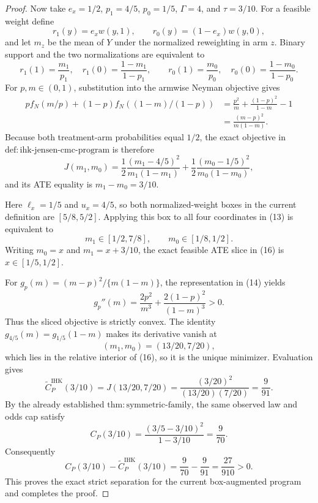 \documentclass{article}
\begin{document}
\begin{proof}
Now take \(e_x=1/2\), \(p_1=4/5\), \(p_0=1/5\), \(\Gamma=4\), and \(\tau=3/10\).  For a feasible weight define
\[
r_1(y)=e_xw(y,1),\qquad r_0(y)=(1-e_x)w(y,0),
\]
and let \(m_z\) be the mean of \(Y\) under the normalized reweighting in arm \(z\).  Binary support and the two normalizations are equivalent to
\[
r_1(1)=\frac{m_1}{p_1},\quad
r_1(0)=\frac{1-m_1}{1-p_1},\qquad
r_0(1)=\frac{m_0}{p_0},\quad
r_0(0)=\frac{1-m_0}{1-p_0}.
\tag{13}
\]
For \(p,m\in(0,1)\), substitution into the armwise Neyman objective gives
\[
\begin{aligned}
pf_N(m/p)+(1-p)f_N((1-m)/(1-p))
&=\frac{p^2}{m}+\frac{(1-p)^2}{1-m}-1\\
&=\frac{(m-p)^2}{m(1-m)}.
\end{aligned}
\tag{14}
\]
Because both treatment-arm probabilities equal \(1/2\), the exact objective in \(\mathrm{def{:}ihk\mbox{-}jensen\mbox{-}cmc\mbox{-}program}\) is therefore
\[
J(m_1,m_0)
=\frac12\frac{(m_1-4/5)^2}{m_1(1-m_1)}
+\frac12\frac{(m_0-1/5)^2}{m_0(1-m_0)},
\tag{15}
\]
and its ATE equality is \(m_1-m_0=3/10\).

Here \(\ell_x=1/5\) and \(u_x=4/5\), so both normalized-weight boxes in the current definition are \([5/8,5/2]\).  Applying this box to all four coordinates in (13) is equivalent to
\[
m_1\in[1/2,7/8],\qquad m_0\in[1/8,1/2].
\tag{16}
\]
Writing \(m_0=x\) and \(m_1=x+3/10\), the exact feasible ATE slice in (16) is \(x\in[1/5,1/2]\).

For \(g_p(m)=(m-p)^2/\{m(1-m)\}\), the representation in (14) yields
\[
g_p''(m)=\frac{2p^2}{m^3}+\frac{2(1-p)^2}{(1-m)^3}>0.
\tag{17}
\]
Thus the sliced objective is strictly convex.  The identity \(g_{4/5}(m)=g_{1/5}(1-m)\) makes its derivative vanish at
\[
(m_1,m_0)=(13/20,7/20),
\tag{18}
\]
which lies in the relative interior of (16), so it is the unique minimizer.  Evaluation gives
\[
\widetilde C^{\mathrm{IHK}}_P(3/10)
=J(13/20,7/20)
=\frac{(3/20)^2}{(13/20)(7/20)}
=\frac9{91}.
\tag{19}
\]
By the already established \(\mathrm{thm{:}symmetric\mbox{-}family}\), the same observed law and odds cap satisfy
\[
C_P(3/10)
=\frac{(3/5-3/10)^2}{1-3/10}
=\frac9{70}.
\tag{20}
\]
Consequently
\[
C_P(3/10)-\widetilde C^{\mathrm{IHK}}_P(3/10)
=\frac9{70}-\frac9{91}
=\frac{27}{910}>0.
\tag{21}
\]
This proves the exact strict separation for the current box-augmented program and completes the proof.
\end{proof}
\end{document}

